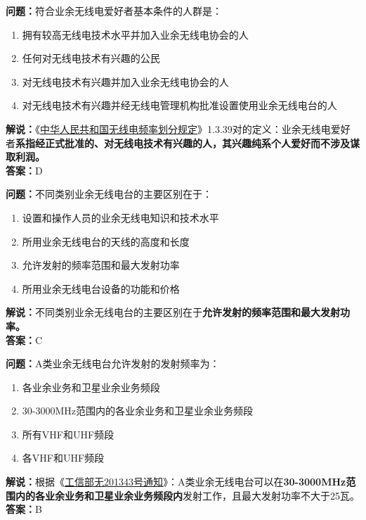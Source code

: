 \textbf{问题：}符合业余无线电爱好者基本条件的人群是：
\begin{enumerate}[label=\Alph*), leftmargin=1cm]
	\item 拥有较高无线电技术水平并加入业余无线电协会的人
	\item 任何对无线电技术有兴趣的公民
	\item 对无线电技术有兴趣并加入业余无线电协会的人
	\item 对无线电技术有兴趣并经无线电管理机构批准设置使用业余无线电台的人
\end{enumerate}
\textbf{解说：}《\href{https://www.miit.gov.cn/zwgk/zcwj/wjfb/txy/art/2020/art_066386284cd2449493586c81ccafed11.html}{中华人民共和国无线电频率划分规定}》1.3.39对的定义：业余无线电爱好者\textbf{系指经正式批准的、对无线电技术有兴趣的人，其兴趣纯系个人爱好而不涉及谋取利润。}\\\textbf{答案：}D

\textbf{问题：}不同类别业余无线电台的主要区别在于：
\begin{enumerate}[label=\Alph*), leftmargin=1cm]
	\item 设置和操作人员的业余无线电知识和技术水平
	\item 所用业余无线电台的天线的高度和长度
	\item 允许发射的频率范围和最大发射功率
	\item 所用业余无线电台设备的功能和价格
\end{enumerate}
\textbf{解说：}不同类别业余无线电台的主要区别在于\textbf{允许发射的频率范围和最大发射功率。}\\\textbf{答案：}C


\textbf{问题：}A类业余无线电台允许发射的发射频率为：
\begin{enumerate}[label=\Alph*), leftmargin=1cm]
	\item 各业余业务和卫星业余业务频段
	\item 30-3000MHz范围内的各业余业务和卫星业余业务频段
	\item 所有VHF和UHF频段
	\item 各VHF和UHF频段
\end{enumerate}
\textbf{解说：}根据《\href{http://www.crac.org.cn/wp-content/uploads/2013/02/%E5%B7%A5%E4%BF%A1%E9%83%A8%E6%97%A0201343%E5%8F%B7.pdf}{工信部无201343号通知}》：A类业余无线电台可以在\textbf{30-3000MHz范围内的各业余业务和卫星业余业务频段内}发射工作，且最大发射功率不大于25瓦。\\\textbf{答案：}B


